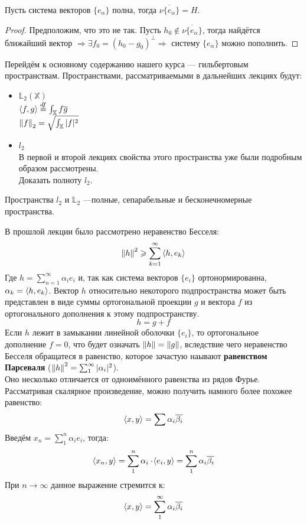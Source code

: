 \documentclass[12pt]{article}
\begin{document}
		\begin{state}
			Пусть система векторов $\{ e_\alpha \}$ полна, тогда $\overline{ \nu \{ e_\alpha \} } = H$.
		\end{state}
		\begin{proof}
			Предположим, что это не так. Пусть $h_0 \notin \overline{ \nu \{ e_\alpha \} }$, тогда найдётся ближайший вектор $\Rightarrow 
			\exists f_0 	= (h_0 - g_0)^\perp	\Rightarrow$ систему $\{ e_{\alpha} \}$ можно пополнить.
		\end{proof}
	


		Перейдём к основному содержанию нашего курса --- гильбертовым пространствам. Пространствами, рассматриваемыми 
		в дальнейших лекциях будут:
		\begin{itemize}
			\item $\mathbb{L}_2(\mathbb{X})$ \\
			$\left\langle f, g \right\rangle \overset{df}{=} \int_{\mathbb{X}} f\overline{g}$ \\
			$\left\| f \right\|_2 = \sqrt{\int_{\mathbb{X}} |f|^2}$ \\
		
			\item $l_2$ \\
			В первой и второй лекциях свойства этого пространства уже были подробным образом рассмотрены. \\
			\exc Доказать полноту $l_2$.
		\end{itemize}
		Пространства $l_2$ и $\mathbb{L}_2$ ---полные, сепарабельные и бесконечномерные пространства.
	
		В прошлой лекции было рассмотрено неравенство Бесселя: \\
		$$\left\| h \right\|^2 \geqslant \sum_{k=1}^{\infty}\left\langle h, e_k \right\rangle$$
		Где $h = \sum_{n=1}^{\infty} \alpha_i e_i$ и, так как система векторов $\{ e_i \}$ ортонормированна, 
		$\alpha_k = \left\langle h, e_k \right\rangle$. Вектор $h$ относительно некоторого подпространства может быть представлен в виде суммы
		ортогональной проекции $g$ и вектора $f$ из ортогонального дополнения к этому подпространству. 
		$$h = g + f$$
		Если $h$ лежит в замыкании линейной оболочки $\{ e_i \}$, то ортогональное дополнение $f = 0$, что будет означать 
		$\left\| h \right\| = \left\| g \right\|$, вследствие чего неравенство Бесселя обращатеся в равенство, которое зачастую наывают 
		\textbf{равенством Парсеваля} ($\left\| h \right\|^2 = \sum_1^{\infty} |\alpha_i|^2$).\\
		Оно несколько отличается от одноимённого равенства из рядов Фурье. Рассматривая скалярное произведение, можно получить
		намного более похожее равенство:
		$$ \left\langle x, y \right\rangle = \sum \alpha_i \overline{\beta_i} $$
		Введём $x_n = \sum_1^n \alpha_i e_i$, тогда:
		$$ \left\langle x_n, y \right\rangle = \sum_1^n \alpha_i \cdot \! \left\langle e_i, y \right\rangle = \sum_1^n \alpha_i \overline{\beta_i}$$
		При $n \rightarrow \infty$ данное выражение стремится к:
		$$ \left\langle x, y \right\rangle = \sum_1^{\infty} \alpha_i \overline{\beta_i} $$
	
\end{document}
